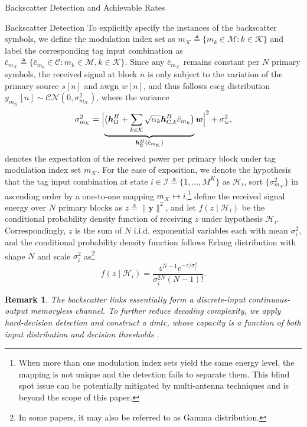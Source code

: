 \documentclass[journal]{IEEEtran}
\newtheorem{remark}{Remark}
\begin{document}
\begin{section}{Backscatter Detection and Achievable Rates}
\begin{subsection}{Backscatter Detection}
			To explicitly specify the instances of the backscatter symbols, we define the modulation index set as $m_{\mathcal{K}} \triangleq \{m_k \in \mathcal{M} : k \in \mathcal{K}\}$ and label the corresponding tag input combination as $\bar{c}_{m_{\mathcal{K}}} \triangleq \{\bar{c}_{m_k} \in \mathcal{C} : m_k \in \mathcal{M}, k \in \mathcal{K}\}$. Since any $\bar{c}_{m_{\mathcal{K}}}$ remains constant per $N$ primary symbols, the received signal at block $n$ is only subject to the variation of the primary source $s[n]$ and \gls{awgn} $w[n]$, and thus follows \gls{cscg} distribution $y_{m_{\mathcal{K}}}[n] \sim \mathcal{CN}\left(0,\sigma_{m_{\mathcal{K}}}^2\right)$, where the variance
			\begin{equation}
				\sigma_{m_{\mathcal{K}}}^2 = \Bigl\lvert \underbrace{\bigl(\boldsymbol{h}_{\mathrm{D}}^H + \sum_{k \in \mathcal{K}} \sqrt{\alpha_k} \boldsymbol{h}_{\mathrm{C},k}^H \bar{c}_{m_k}\bigr)}_{\boldsymbol{h}_{\mathrm{E}}^H(\bar{c}_{m_{\mathcal{K}}})} \boldsymbol{w} \Bigr\rvert^2 + \sigma_w^2,
				\label{eq:receive_variance}
			\end{equation}
			denotes the expectation of the received power per primary block under tag modulation index set $m_{\mathcal{K}}$. For the ease of exposition, we denote the hypothesis that the tag input combination at state $i \in \mathcal{I} \triangleq \{1,\ldots,M^K\}$ as $\mathcal{H}_i$, sort $\{\sigma_{m_{\mathcal{K}}}^2\}$ in ascending order by a one-to-one mapping $m_{\mathcal{K}} \mapsto i$,\footnote{When more than one modulation index sets yield the same energy level, the mapping is not unique and the detection fails to separate them. This blind spot issue can be potentially mitigated by multi-antenna techniques and is beyond the scope of this paper.} define the received signal energy over $N$ primary blocks as $z \triangleq \lVert \boldsymbol{y} \rVert^2$, and let $f(z \mid \mathcal{H}_i)$ be the conditional probability density function of receiving $z$ under hypothesis $\mathcal{H}_i$. Correspondingly, $z$ is the sum of $N$ i.i.d. exponential variables each with mean $\sigma_i^2$, and the conditional probability density function follows Erlang distribution with shape $N$ and scale $\sigma_i^2$ as\footnote{In some papers, it may also be referred to as Gamma distribution.}
			\begin{equation}
				f(z \mid \mathcal{H}_i) = \frac{z^{N-1} e^{-z/\sigma_i^2}}{\sigma_i^{2N} (N-1)!}.
				\label{eq:energy_distribution}
			\end{equation}

			\begin{remark}
				The backscatter links essentially form a discrete-input continuous-output memoryless channel. To further reduce decoding complexity, we apply hard-decision detection and construct a \gls{dmtc}, whose capacity is a function of both input distribution and decision thresholds \cite{Nguyen2018}.
			\end{remark}


\end{subsection}
\end{section}
\end{document}
